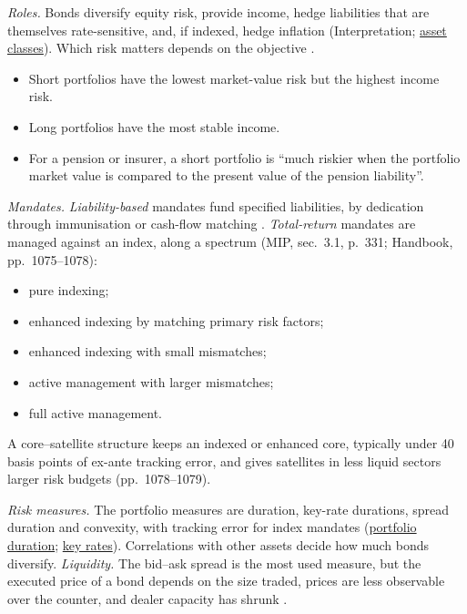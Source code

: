 \begin{qfdefinition}\label{def:fixed-income-mandates-return-model}
 \emph{Roles.} Bonds diversify equity risk, provide income, hedge liabilities that are themselves rate-sensitive, and, if indexed, hedge inflation (Interpretation; \hyperref[def:asset-class-characteristics]{asset classes}). Which risk matters depends on the objective \citep[chap.~43, pp.~1081--1083, Exhibit~43-3]{s7-fabozzifixed}.
\begin{itemize}
\item Short portfolios have the lowest market-value risk but the highest income risk.
\item Long portfolios have the most stable income.
\item For a pension or insurer, a short portfolio is ``much riskier when the portfolio market value is compared to the present value of the pension liability''.
\end{itemize}

\emph{Mandates.} \emph{Liability-based} mandates fund specified liabilities, by dedication through immunisation or cash-flow matching \citep[chap.~6, sec.~4, pp.~346--365]{managing-investment-portfolios-2007}. \emph{Total-return} mandates are managed against an index, along a spectrum (MIP, sec.~3.1, p.~331; Handbook, pp.~1075--1078):
\begin{itemize}
\item pure indexing;
\item enhanced indexing by matching primary risk factors;
\item enhanced indexing with small mismatches;
\item active management with larger mismatches;
\item full active management.
\end{itemize}
A core--satellite structure keeps an indexed or enhanced core, typically under 40 basis points of ex-ante tracking error, and gives satellites in less liquid sectors larger risk budgets (pp.~1078--1079).

\emph{Risk measures.} The portfolio measures are duration, key-rate durations, spread duration and convexity, with tracking error for index mandates (\hyperref[meth:convexity-portfolio-duration]{portfolio duration}; \hyperref[meth:yield-curve-factor-exposures]{key rates}). Correlations with other assets decide how much bonds diversify. \emph{Liquidity.} The bid--ask spread is the most used measure, but the executed price of a bond depends on the size traded, prices are less observable over the counter, and dealer capacity has shrunk \citep[chap.~44, pp.~1097--1099]{s7-fabozzifixed}.


\end{qfdefinition}
